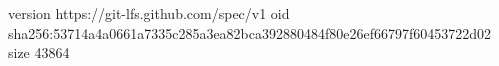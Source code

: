 version https://git-lfs.github.com/spec/v1
oid sha256:53714a4a0661a7335c285a3ea82bca392880484f80e26ef66797f60453722d02
size 43864
